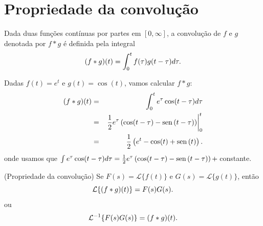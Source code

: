 \section{Propriedade da convolução}
Dada duas funções contínuas por partes em $[0,\infty]$, a convolução  de $f$ e $g$ denotada por $f*g$ é definida pela integral
\begin{equation}{\label{def_conv}}
 (f*g)(t)=\int_0^t f(\tau)g(t-\tau)d\tau.
\end{equation}
\begin{ex}{\label{ex_conv_1}}Dadas $f(t)=e^t$ e $g(t)=\cos(t)$, vamos calcular $f*g$:
\begin{eqnarray*}
 (f*g)(t)&=&\int_0^t e^{\tau} \cos(t-\tau)d\tau\\
 &=&\left. \frac{1}{2}e^\tau\left(\cos(t-\tau)-\operatorname{sen}\,(t-\tau)  \right)\right|_0^t\\
 &=& \frac{1}{2}\left(e^t-\cos(t)+\operatorname{sen}\,(t)  \right).
\end{eqnarray*}
onde usamos que $\int  e^{\tau} \cos(t-\tau)d\tau=\frac{1}{2}e^\tau\left(\cos(t-\tau)-\sen(t-\tau)  \right)+\ \!$constante.
\end{ex}
\begin{teo}{\label{prop_conv}}(Propriedade da convolução) Se $F(s)=\mathcal{L}\{f(t)\}$ e $G(s)=\mathcal{L}\{g(t)\}$, então
\begin{equation}{\label{eq_prop_conv}}
 \mathcal{L}\{(f*g)(t)\}=F(s)G(s).
\end{equation}
ou
\begin{equation}{\label{eq_inv_prop_conv}}
 \mathcal{L}^{-1}\{F(s)G(s)\}=(f*g)(t).
\end{equation}
\end{teo}
